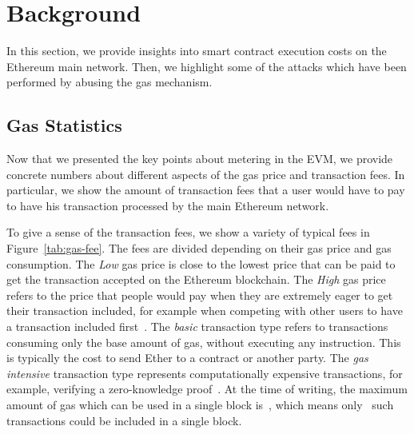 \section{Background}
\label{sec:background}
In this section, we provide insights into smart contract execution costs on the Ethereum main network. Then, we highlight some of the attacks which have been performed by abusing the gas mechanism.

\subsection{Gas Statistics}
Now that we presented the key points about metering in the EVM, we provide concrete numbers about different aspects of the gas price and transaction fees. In particular, we show the amount of transaction fees that a user would have to pay to have his transaction processed by the main Ethereum network.

To give a sense of the transaction fees, we show a variety of typical fees in Figure~\ref{tab:gas-fee}. The fees are divided depending on their gas price and gas consumption. The \textit{Low} gas price is close to the lowest price that can be paid to get the transaction accepted on the Ethereum blockchain. The \textit{High} gas price refers to the price that people would pay when they are extremely eager to get their transaction included, for example when competing with other users to have a transaction included first~\cite{gas-price-history}. The \textit{basic} transaction type refers to transactions consuming only the base amount of gas, without executing any instruction. This is typically the cost to send Ether to a contract or another party. The \textit{gas intensive} transaction type represents computationally expensive transactions, for example, verifying a zero-knowledge proof~\cite{aztec-protocol}. At the time of writing, the maximum amount of gas which can be used in a single block is~, which means only~ such transactions could be included in a single block.

